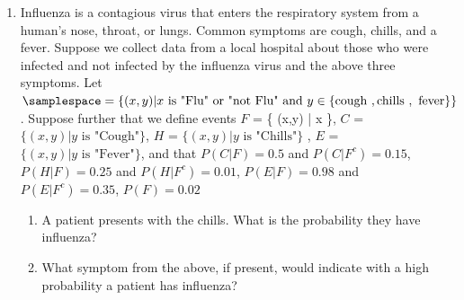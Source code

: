 \documentclass[krantz1,ChapterTOCs]{krantz}
\begin{document}
\begin{enumerate}
   \item Influenza is a contagious virus that enters the respiratory system from a human's nose, throat, or lungs. Common symptoms are cough, chills, and a fever.
   Suppose we collect data from a local hospital about those who were infected and not infected by the influenza virus and the above three symptoms. Let $\samplespace = \{ (x,y)  | x \text{ is } \text{"Flu"} \text{ or } \text{"not Flu"} \text{ and } y \in \{ \text{cough },\text{chills },\text{ fever} \}   \}$. 
   Suppose further that we define events $F$ = \{ (x,y)  | x   \}, $C$ = $\{ (x,y)  | y \text{ is } \text{"Cough"} \}$, $H$ = $\{ (x,y)  | y \text{ is } \text{"Chills"} \}$ , $E$ = $\{ (x,y)  | y \text{ is } \text{"Fever"} \}$, and that $P( C|F ) = 0.5$ and $P( C|F^{c} ) = 0.15$, $P( H|F ) = 0.25$ and $P( H|F^{c} ) = 0.01$, $P( E|F ) = 0.98$ and $P( E|F^{c} ) = 0.35$, $P(F) = 0.02$  
    \begin{enumerate}
       \item A patient presents with the chills. What is the probability they have influenza? 
       
       \begin{enumerate}
        \item {\color{red}
            \begin{align*}
                P(F | H) &= \frac{P(H | F)P(F)}{P(H)}\\
                P(F | H) &= \frac{0.25 * 0.02  }{ 0.25*0.02 + 0.01*0.98} \\
                &= \frac{0.005}{ 0.0148 }\\
                &= 0.337
             \end{align*}
        \end{enumerate}
       
       \item What symptom from the above, if present, would indicate with a high probability a patient has influenza?
       

\end{enumerate}
\end{enumerate}
\end{document}
